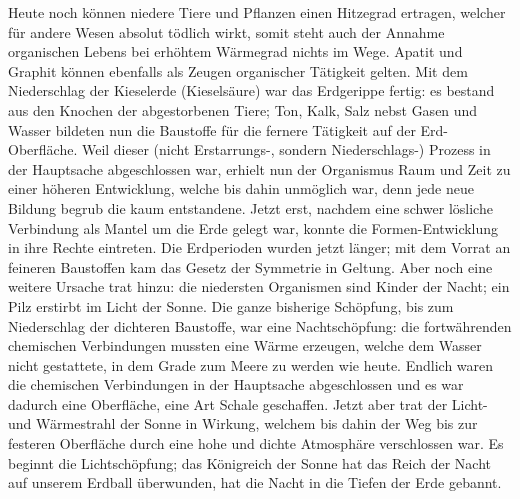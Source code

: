 \documentclass[a4paper, 12pt, oneside]{article}
\begin{document}
Heute noch können niedere Tiere und Pflanzen einen Hitzegrad ertragen, welcher für andere Wesen absolut tödlich wirkt, somit steht auch der Annahme organischen Lebens bei erhöhtem Wärmegrad nichts im Wege. Apatit und Graphit können ebenfalls als Zeugen organischer Tätigkeit gelten. Mit dem Niederschlag der Kieselerde (Kieselsäure) war das Erdgerippe fertig: es bestand aus den Knochen der abgestorbenen Tiere; Ton, Kalk, Salz nebst Gasen und Wasser bildeten nun die Baustoffe für die fernere Tätigkeit auf der Erd-Oberfläche. Weil dieser (nicht Erstarrungs-, sondern Niederschlags-) Prozess in der Hauptsache abgeschlossen war, erhielt nun der Organismus Raum und Zeit zu einer höheren Entwicklung, welche bis dahin unmöglich war, denn jede neue Bildung begrub die kaum entstandene. Jetzt erst, nachdem eine schwer lösliche Verbindung als Mantel um die Erde gelegt war, konnte die Formen-Entwicklung in ihre Rechte eintreten. Die Erdperioden wurden jetzt länger; mit dem Vorrat an feineren Baustoffen kam das Gesetz der Symmetrie in Geltung. Aber noch eine weitere Ursache trat hinzu: die niedersten Organismen sind Kinder der Nacht; ein Pilz erstirbt im Licht der Sonne. Die ganze bisherige Schöpfung, bis zum Niederschlag der dichteren Baustoffe, war eine Nachtschöpfung: die fortwährenden chemischen Verbindungen mussten eine Wärme erzeugen, welche dem Wasser nicht gestattete, in dem Grade zum Meere zu werden wie heute. Endlich waren die chemischen Verbindungen in der Hauptsache abgeschlossen und es war dadurch eine Oberfläche, eine Art Schale geschaffen. Jetzt aber trat der Licht- und Wärmestrahl der Sonne in Wirkung, welchem bis dahin der Weg bis zur festeren Oberfläche durch eine hohe und dichte Atmosphäre verschlossen war. Es beginnt die Lichtschöpfung; das Königreich der Sonne hat das Reich der Nacht auf unserem Erdball überwunden, hat die Nacht in die Tiefen der Erde gebannt.
\end{document}
